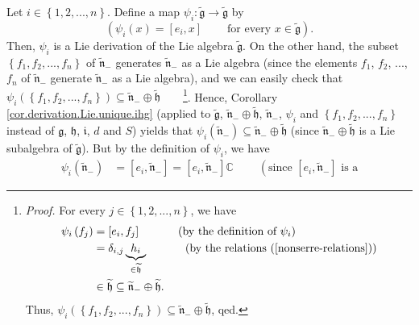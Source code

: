 \documentclass[etingof-lie.tex]{subfiles}
\begin{document}
\begin{vershort}
Let $i\in\left\{  1,2,...,n\right\}  $. Define a map $\psi_{i}%
:\widetilde{\mathfrak{g}}\rightarrow\widetilde{\mathfrak{g}}$ by%
\[
\left(  \psi_{i}\left(  x\right)  =\left[  e_{i},x\right]
\ \ \ \ \ \ \ \ \ \ \text{for every }x\in\widetilde{\mathfrak{g}}\right)  .
\]
Then, $\psi_{i}$ is a Lie derivation of the Lie algebra
$\widetilde{\mathfrak{g}}$. On the other hand, the subset $\left\{
f_{1},f_{2},...,f_{n}\right\}  $ of $\widetilde{\mathfrak{n}}_{-}$ generates
$\widetilde{\mathfrak{n}}_{-}$ as a Lie algebra (since the elements $f_{1}$,
$f_{2}$, $...$, $f_{n}$ of $\widetilde{\mathfrak{n}}_{-}$ generate
$\widetilde{\mathfrak{n}}_{-}$ as a Lie algebra), and we can easily check that
$\psi_{i}\left(  \left\{  f_{1},f_{2},...,f_{n}\right\}  \right)
\subseteq\widetilde{\mathfrak{n}}_{-}\oplus\widetilde{\mathfrak{h}}%
$\ \ \ \ \footnote{\textit{Proof.} For every $j\in\left\{  1,2,...,n\right\}
$, we have%
\begin{align*}
\psi_{i}\left(  f_{j}\right)   &  =\left[  e_{i},f_{j}\right]
\ \ \ \ \ \ \ \ \ \ \left(  \text{by the definition of }\psi_{i}\right) \\
&  =\delta_{i,j}\underbrace{h_{i}}_{\in\widetilde{\mathfrak{h}}}%
\ \ \ \ \ \ \ \ \ \ \left(  \text{by the relations (\ref{nonserre-relations}%
)}\right) \\
&  \in\widetilde{\mathfrak{h}}\subseteq\widetilde{\mathfrak{n}}_{-}%
\oplus\widetilde{\mathfrak{h}}.
\end{align*}
Thus, $\psi_{i}\left(  \left\{  f_{1},f_{2},...,f_{n}\right\}  \right)
\subseteq\widetilde{\mathfrak{n}}_{-}\oplus\widetilde{\mathfrak{h}}$, qed.}.
Hence, Corollary \ref{cor.derivation.Lie.unique.ihg} (applied to
$\widetilde{\mathfrak{g}}$, $\widetilde{\mathfrak{n}}_{-}\oplus
\widetilde{\mathfrak{h}}$, $\widetilde{\mathfrak{n}}_{-}$, $\psi_{i}$ and
$\left\{  f_{1},f_{2},...,f_{n}\right\}  $ instead of $\mathfrak{g}$,
$\mathfrak{h}$, $\mathfrak{i}$, $d$ and $S$) yields that $\psi_{i}\left(
\widetilde{\mathfrak{n}}_{-}\right)  \subseteq\widetilde{\mathfrak{n}}%
_{-}\oplus\widetilde{\mathfrak{h}}$ (since $\widetilde{\mathfrak{n}}_{-}%
\oplus\widetilde{\mathfrak{h}}$ is a Lie subalgebra of
$\widetilde{\mathfrak{g}}$). But by the definition of $\psi_{i}$, we have%
\begin{align*}
\psi_{i}\left(  \widetilde{\mathfrak{n}}_{-}\right)   &  =\left[
e_{i},\widetilde{\mathfrak{n}}_{-}\right]  =\left[  e_{i}%
,\widetilde{\mathfrak{n}}_{-}\right]  \mathbb{C}\ \ \ \ \ \ \ \ \ \ \left(
\text{since }\left[  e_{i},\widetilde{\mathfrak{n}}_{-}\right]  \text{ is a
}
\end{align*}
\end{vershort}
\end{document}
